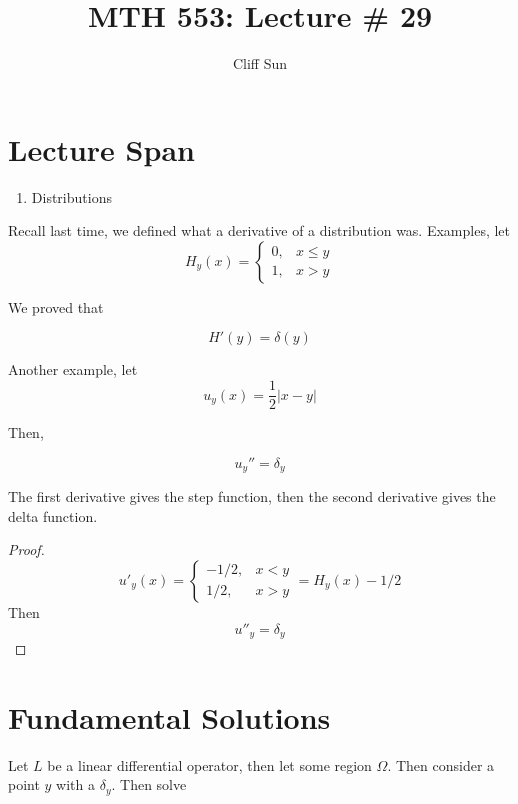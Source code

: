 \documentclass{article}
\title{MTH 553: Lecture \# 29}
\author{Cliff Sun}
\newtheorem{one minute paper}[theorem]{One Minute Paper}
\begin{document}
\maketitle

\section*{Lecture Span}
\begin{enumerate}
    \item Distributions
\end{enumerate}

Recall last time, we defined what a derivative of a distribution was. Examples, let $$H_y(x) = \begin{cases}
    0, & x \leq y \\
    1, & x > y
\end{cases}$$

We proved that 

\begin{equation}
    H'(y) = \delta(y)
\end{equation}

Another example, let $$u_y(x) = \frac{1}{2}|x-y|$$

Then, 

\begin{equation}
    u_y'' = \delta_y
\end{equation}

The first derivative gives the step function, then the second derivative gives the delta function. 

\begin{proof}
    \begin{equation}
        u'_y(x) = \begin{cases}
            -1/2, & x < y \\
            1/2, & x > y
        \end{cases} = H_y(x) - 1/2
    \end{equation}
    Then 
    \begin{equation}
        u''_y  = \delta_y
    \end{equation}
\end{proof}

\section{Fundamental Solutions}

Let $L$ be a linear differential operator, then let some region $\Omega$. Then consider a point $y$ with a $\delta_y$. Then solve 
\end{document}
